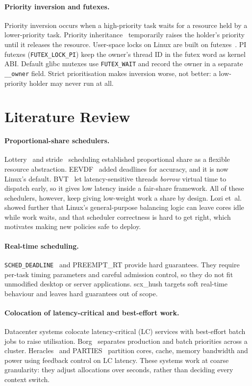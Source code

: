 \documentclass[11pt,a4paper]{article}
\newcommand{\code}[1]{\texttt{#1}}
\begin{document}
\paragraph{Priority inversion and futexes.}
Priority inversion occurs when a high-priority task waits for a resource held
by a lower-priority task. Priority inheritance~\cite{sha1990pip} temporarily
raises the holder's priority until it releases the resource. User-space locks
on Linux are built on futexes~\cite{franke2002futex}. PI futexes
(\code{FUTEX\_LOCK\_PI}) keep the owner's thread ID in the futex word as
kernel ABI. Default glibc mutexes use \code{FUTEX\_WAIT} and record the owner
in a separate \code{\_\_owner} field. Strict prioritisation makes inversion
worse, not better: a low-priority holder may never run at all.

\section{Literature Review}
\label{sec:related}

\paragraph{Proportional-share schedulers.}
Lottery~\cite{waldspurger1994lottery} and stride~\cite{waldspurger1995stride}
scheduling established proportional share as a flexible resource abstraction.
EEVDF~\cite{stoica1995eevdf} added deadlines for accuracy, and it is now
Linux's default. BVT~\cite{duda1999bvt} let latency-sensitive threads
\emph{borrow} virtual time to dispatch early, so it gives low latency inside a
fair-share framework. All of these schedulers, however, keep giving
low-weight work a share by design. Lozi et~al.~\cite{lozi2016wasted} showed
further that Linux's general-purpose balancing logic can leave cores idle
while work waits, and that scheduler correctness is hard to get right, which
motivates making new policies safe to deploy.

\paragraph{Real-time scheduling.}
\code{SCHED\_DEADLINE}~\cite{lelli2016deadline} and PREEMPT\_RT provide hard
guarantees. They require per-task timing parameters and careful admission
control, so they do not fit unmodified desktop or server applications.
scx\_hush targets soft real-time behaviour and leaves hard guarantees out of
scope.

\paragraph{Colocation of latency-critical and best-effort work.}
Datacenter systems colocate latency-critical (LC) services with best-effort
batch jobs to raise utilisation. Borg~\cite{verma2015borg} separates
production and batch priorities across a cluster. Heracles~\cite{lo2015heracles}
and PARTIES~\cite{chen2019parties} partition cores, cache, memory bandwidth and
power using feedback control on LC latency. These systems work at coarse
granularity: they adjust allocations over seconds, rather than deciding every
context switch.
\end{document}
